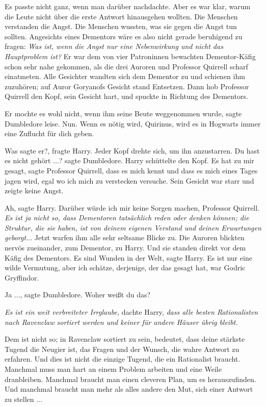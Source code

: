 Es passte nicht ganz, wenn man darüber nachdachte. Aber es war klar, warum die
Leute nicht über die erste Antwort hinausgehen wollten. Die Menschen verstanden
die Angst. Die Menschen wussten, was sie gegen die Angst tun sollten. Angesichts
eines Dementors wäre es also nicht gerade beruhigend zu fragen: \emph{\glqq{}Was
ist, wenn die Angst nur eine Nebenwirkung und nicht das} \emph{Hauptproblem
ist?}\grqq{} Er war dem von vier Patroninnen bewachten Dementor-Käfig schon sehr
nahe gekommen, als die drei Auroren und Professor Quirrell scharf einatmeten.
Alle Gesichter wandten sich dem Dementor zu und schienen ihm zuzuhören; auf
Auror Goryanofs Gesicht stand Entsetzen. Dann hob Professor Quirrell den Kopf,
sein Gesicht hart, und spuckte in Richtung des Dementors.

\glqq{}Er mochte es wohl nicht, wenn ihm seine Beute weggenommen wurde\grqq{},
sagte Dumbledore leise. \glqq{}Nun. Wenn es nötig wird, Quirinus, wird es in
Hogwarts immer eine Zuflucht für dich geben.\grqq{}

\glqq{}Was sagte er?\grqq{}, fragte Harry. Jeder Kopf drehte sich, um ihn
anzustarren. \glqq{}Du hast es nicht gehört ...?\grqq{} sagte Dumbledore. Harry
schüttelte den Kopf. \glqq{}Es hat zu mir gesagt\grqq{}, sagte Professor
Quirrell, \glqq{}dass es mich kennt und dass es mich eines Tages jagen wird, egal
wo ich mich zu verstecken versuche.\grqq{} Sein Gesicht war starr und zeigte keine
Angst.

\glqq{}Ah\grqq{}, sagte Harry. \glqq{}Darüber würde ich mir keine Sorgen machen,
Professor Quirrell.\grqq{} \emph{Es ist ja nicht so, dass Dementoren tatsächlich reden
oder denken können; die Struktur, die sie haben, ist von deinem eigenen Verstand
und deinen Erwartungen geborgt.}.. Jetzt warfen ihm alle sehr seltsame Blicke
zu. Die Auroren blickten nervös zueinander, zum Dementor, zu Harry. Und sie
standen direkt vor dem Käfig des Dementors. \glqq{}Es sind Wunden in der
Welt\grqq{}, sagte Harry. \glqq{}Es ist nur eine wilde Vermutung, aber ich
schätze, derjenige, der das gesagt hat, war Godric Gryffindor.\grqq{}

\glqq{}Ja ...\grqq{}, sagte Dumbledore. \glqq{}Woher weißt du das?\grqq{}

\emph{Es ist ein weit verbreiteter Irrglaube,} dachte Harry, \emph{dass alle
besten Rationalisten nach Ravenclaw sortiert werden und keiner für andere Häuser
übrig bleibt.}

Dem ist nicht so; in Ravenclaw sortiert zu sein, bedeutet, dass deine stärkste
Tugend die Neugier ist, das Fragen und der Wunsch, die wahre Antwort zu
erfahren. Und dies ist nicht die einzige Tugend, die ein Rationalist braucht.
Manchmal muss man hart an einem Problem arbeiten und eine Weile dranbleiben.
Manchmal braucht man einen cleveren Plan, um es herauszufinden. Und manchmal
braucht man mehr als alles andere den Mut, sich einer Antwort zu stellen ...

